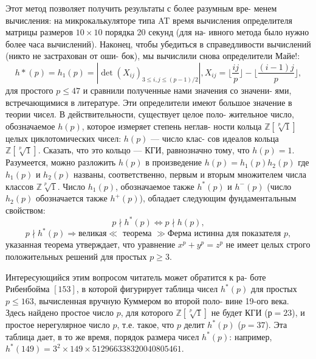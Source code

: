 \documentclass{mai_book}
\begin{document}
Этот метод позволяет получить результаты с более разумным вре- \linebreak менем вычисления: на микрокалькуляторе типа AT время вычисления \linebreak определителя матрицы размеров $10 \times 10$ порядка 20 секунд (для на- \linebreak ивного метода было нужно более часа вычислений). Наконец, чтобы \linebreak убедиться в справедливости вычислений (никто не застрахован от оши-\linebreak
\noindent бок), мы вычислили снова определители Майе!:  
$$h*(p)=h_1(p)=|\det (X_{ij})_{3 \le i, j \le (p-1)/2}|, X_{ij}=\lfloor{\frac{ij}{p}}\rfloor - \lfloor{\frac{(i-1)j}{p}}\rfloor,$$
для простого $p \le 47$ и сравнили полученные нами значения со значени- \linebreak ями, встречающимися в литературе. Эти определители имеют большое \linebreak значение в теории чисел. В действительности, существует целое поло- \linebreak жительное число, обозначаемое $h(p)$, которое измеряет степень неглав- \linebreak ности кольца $\mathbb{Z}[\sqrt[p]{1}]$ целых циклотомических чисел: $h(p)$ — число клас- \linebreak сов идеалов кольца $\mathbb{Z}[\sqrt[p]{1}]$. Сказать, что это кольцо — КГИ, равнозначно \linebreak тому, что $h(p) = 1$. Разумеется, можно разложить $h(p)$ в произведение \linebreak $h(p) = h_1(p)h_2(p)$ где $h_1(p)$ и $h_2(p)$ названы, соответственно, первым \linebreak и вторым множителем числа классов $\mathbb{Z}\sqrt[p]{1}$. Число $h_1(p)$, обозначаемое \linebreak также $h^*(p)$ и $h^-(p)$ (число $h_2(p)$ обозначается также $h^+(p)$), обладает \linebreak следующим фундаментальным свойством:
$$p \nmid h^*(p)\Longleftrightarrow p \nmid h(p),$$
$$p \nmid h^*(p) \Rightarrow \text{великая} \ll \text{ теорема } \gg \text{Ферма истинна для показателя } p,$$
указанная теорема утверждает, что уравнение $x^p + y^p = z^p$ не имеет \linebreak целых строго положительных решений для простых $p \ge 3$.
  
Интересующийся этим вопросом читатель может обратится к ра- \linebreak боте Рибенбойма $[153]$, в которой фигурирует таблица чисел $h^*(p)$ для \linebreak простых $p \le 163$, вычисленная вручную Куммером во второй поло- \linebreak вине 19-ого века. Здесь найдено простое число $p$, для которого $\mathbb{Z}[\sqrt[p]{1}]$ не \linebreak будет КГИ ($р = 23$), и простое нерегулярное число $p$, т.е. такое, что $p$ \linebreak делит $h^*(p)$ ($p = 37$). Эта таблица дает, в то же время, порядок размера \linebreak чисел $h^*(p)$: например, $h^*(149) = 3^2 \times 149 \times 512966338320040805461$.
\end{document}
